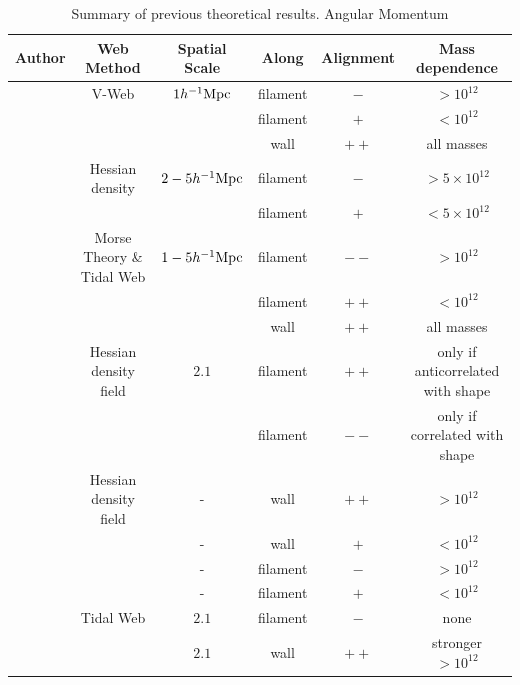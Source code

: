 \documentclass[usenatbib]{mn2e}
\newcommand{\hMpc}{{\ifmmode{h^{-1}{\rm Mpc}}\else{$h^{-1}$Mpc }\fi}}
\newcommand{\hMsun}{{\ifmmode{h^{-1}{\rm
        {M_{\odot}}}}\else{$h^{-1}{\rm{M_{\odot}}}$}\fi}}
\begin{document}
\begin{table}
\begin{tabular}{cccccc}\hline\hline
Author & Web Method & Spatial Scale & Along &
Alignment & Mass dependence\\\hline


\cite{Libeskind2013} & V-Web & $1 \hMpc$ & 
filament &$-$ & $>10^{12}$\hMsun\\

&   & & 
filament &$+$ & $<10^{12}$\hMsun\\

&   & & 
wall & $++$ & all masses\\

\cite{Trowland2013} & Hessian density & $2-5\hMpc$ & 
filament & $-$ & $> 5\times 10^{12}$\hMsun\\
&   & & 
filament & $+$ & $< 5\times 10^{12}$\hMsun\\

\cite{Codis2012} & Morse Theory \& Tidal Web & $1-5\hMpc$ & 
filament & $--$ & $>10^{12}$\hMsun \\ 

&   & & 
filament & $++$ & $<10^{12}$\hMsun \\ 

& & & 
wall & $++$ & all masses\\

\cite{Zhang2009}  & Hessian density field &  $2.1$\hMpc & 
filament & $++$ & only if anticorrelated with shape\\

& &  & 
filament & $--$ & only if correlated with shape\\

\cite{AragonCalvo2007} & Hessian density field & - &
wall & $++$ & $>10^{12}$\hMsun\\


& & - &
wall & $+$ & $<10^{12}$\hMsun\\

& & - &
filament& $-$ & $>10^{12}$\hMsun\\


& & - &
filament& $+$ & $<10^{12}$\hMsun\\



\cite{Hahn2007} & Tidal Web & $2.1$\hMpc & filament & $-$& none\\


& &  $2.1$\hMpc &
wall & $++$ & stronger $>10^{12}$\hMsun\\\hline \hline

\end{tabular}
\caption{Summary of previous theoretical results.
Angular Momentum}
\end{table}
\end{document}
